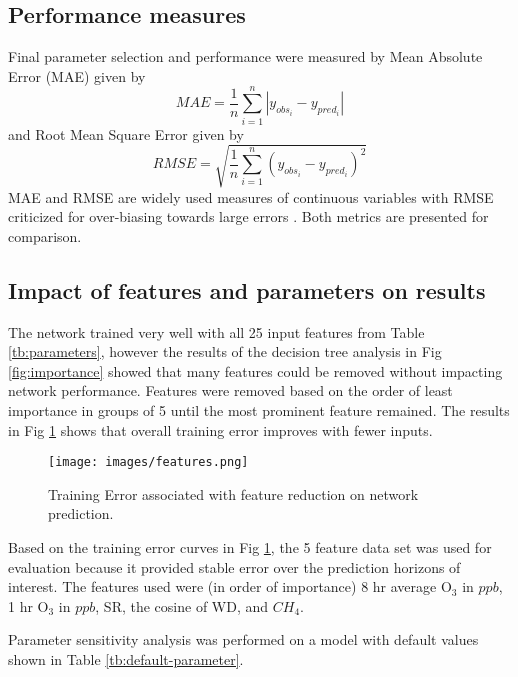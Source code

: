 \documentclass[preprint,12pt,a4paper,authoryear]{elsarticle}
\begin{document}
\begin{linenumbers}
\subsection{Performance measures}

Final parameter selection and performance were measured by Mean Absolute Error (MAE) given by 
%
\begin{equation}
\label{eq:MAE}
MAE = \frac{1}{n}\sum^{n}_{i=1} \left | y_{obs_{i}}- y_{pred_{i}} \right |
\end{equation}
%
and Root Mean Square Error given by
%
\begin{equation}
\label{eq:RMSE}
RMSE = \sqrt{\frac{1}{n}\sum^{n}_{i=1} \left ( y_{obs_{i}}- y_{pred_{i}} \right )^{2}}
\end{equation}
%
MAE and RMSE are widely used measures of continuous variables with RMSE criticized for over-biasing towards large errors \citep{Chai2014, Willmott2005}. Both metrics are presented for comparison.

\subsection{Impact of features and parameters on results}

The network trained very well with all 25 input features from Table \ref{tb:parameters}, however the results of the decision tree analysis in Fig \ref{fig:importance} showed that many features could be removed without impacting network performance. Features were removed based on the order of least importance in groups of 5 until the most prominent feature remained. The results in Fig \ref{fig:features} shows that overall training error improves with fewer inputs.
%
\begin{figure}[H]
\centering
\texttt{[image: images/features.png]}  %
\caption{Training Error associated with feature reduction on network prediction.}
\label{fig:features}
\end{figure}
%
Based on the training error curves in Fig \ref{fig:features}, the 5 feature data set was used for evaluation because it provided stable error over the prediction horizons of interest. The features used were (in order of importance) 8 hr average O$_{3}$ in $ppb$, 1 hr O$_{3}$ in $ppb$, SR, the cosine of WD, and $CH_{4}$.

Parameter sensitivity analysis was performed on a model with default values shown in Table \ref{tb:default-parameter}.
%
\end{linenumbers}
\end{document}
